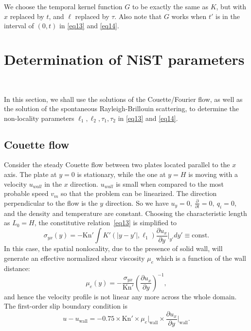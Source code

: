 \documentclass[lineno]{jfm}
\begin{document}
We choose the temporal kernel function $G$ to be exactly the same as $K$, but with $x$ replaced by $t$, and $\ell$ replaced by $\tau$. Also note that $G$ works when $t'$ is in the interval of $(0,t)$ in \eqref{eq13} and \eqref{eq14}.

 

\section{Determination of NiST parameters}~\label{dataExtraction}

In this section, we shall use the solutions of the Couette/Fourier flow, as well as the solution of the spontaneous Rayleigh-Brillouin scattering, to determine the non-locality parameters $\ell_1, \ell_2, \tau_1, \tau_2$ in \eqref{eq13} and \eqref{eq14}. 

\subsection{Couette flow}

Consider the steady Couette flow between two plates located parallel to the  $x$ axis. The plate at $y=0$ is stationary, while the one at  $y=H$ is moving with a velocity $u_{wall}$ in the $x$ direction. $u_{wall}$ is small when compared to the most probable speed $v_m$ so that the problem can be linearized. The direction perpendicular to the flow is the $y$ direction. So we have $u_y = 0,~ \frac{\partial}{\partial t} = 0,~ q_i = 0$, and the density and temperature are constant. Choosing the characteristic length as $L_0=H$,
the constitutive relation~\eqref{eq13} is simplified to 
\begin{equation}\label{eq23}
	\sigma_{yx}(y) = -\text{Kn}' \int K'(| y - y'|,\ell_1) \frac{\partial u_x}{\partial y}\bigg|_{y'}  d y' \equiv \text{const}.
\end{equation}
In this case, the spatial nonlocality, due to the presence of solid wall, will generate an effective normalized shear viscosity ${\mu}_{e}$ which is a function of the wall distance:
\begin{equation}\label{eq24}
	{\mu}_{e}(y) =-\frac{{\sigma}_{yx}}{\text{Kn}'} \left(\frac{\partial {u}_x}{\partial {y}}\right)^{-1},
\end{equation}
and hence the velocity profile is not linear any more across the whole domain. 
The first-order slip boundary condition is
\begin{equation}\label{eq26}
	{u}-{u}_{\text{wall}} =-0.75\times \text{Kn}' \times {\mu}_{e}\big|_\text{wall} \times \frac{\partial {u}_x}{\partial {y}}\bigg|_\text{wall}.
\end{equation}
\end{document}
